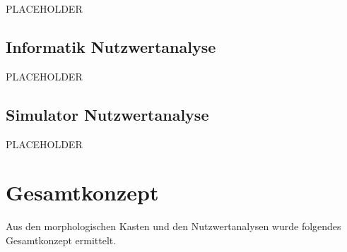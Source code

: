 PLACEHOLDER

\subsection{Informatik Nutzwertanalyse}

PLACEHOLDER

\subsection{Simulator Nutzwertanalyse}

PLACEHOLDER

\newpage
\section{Gesamtkonzept}

Aus den morphologischen Kasten und den Nutzwertanalysen wurde folgendes Gesamtkonzept ermittelt. 

